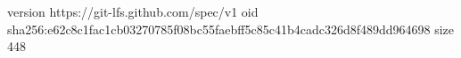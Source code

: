 version https://git-lfs.github.com/spec/v1
oid sha256:e62c8c1fac1cb03270785f08bc55faebff5c85c41b4cadc326d8f489dd964698
size 448
